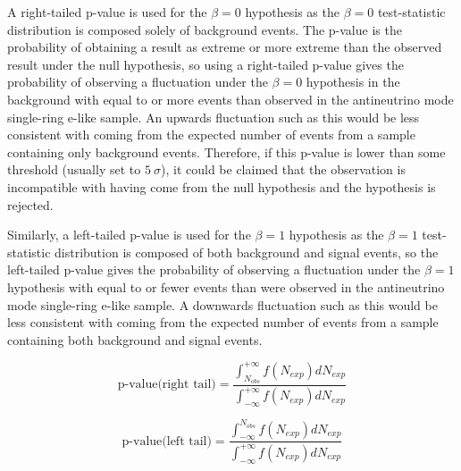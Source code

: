 A right-tailed p-value is used for the $\beta = 0$ hypothesis as the $\beta = 0$ test-statistic distribution is composed solely of background events. The p-value is the probability of obtaining a result as extreme or more extreme than the observed result under the null hypothesis, so using a right-tailed p-value gives the probability of observing a fluctuation under the $\beta = 0$ hypothesis in the background with equal to or more events than observed in the antineutrino mode single-ring e-like sample. An upwards fluctuation such as this would be less consistent with coming from the expected number of events from a sample containing only background events. Therefore, if this p-value is lower than some threshold (usually set to $\SI{5}{\sigma}$), it could be claimed that the observation is incompatible with having come from the null hypothesis and the hypothesis is rejected. 

Similarly, a left-tailed p-value is used for the $\beta = 1$ hypothesis as the $\beta = 1$ test-statistic distribution is composed of both background and signal events, so the left-tailed p-value gives the probability of observing a fluctuation under the $\beta = 1$ hypothesis with equal to or fewer events than were observed in the antineutrino mode single-ring e-like sample. A downwards fluctuation such as this would be less consistent with coming from the expected number of events from a sample containing both background and signal events.

\begin{equation} \label{eq:pval_right}
\textrm{p-value} \textrm{(right tail)} = 
\frac{\int_{N_{obs}}^{+\infty} f \left( N_{exp} \right) dN_{exp}}{ \int_{-\infty}^{+\infty} f \left( N_{exp} \right) dN_{exp}}
\end{equation}

\begin{equation} \label{eq:pval_left}
\textrm{p-value} \textrm{(left tail)} = 
\frac{\int^{N_{obs}}_{-\infty} f \left( N_{exp} \right) dN_{exp}}{ \int_{-\infty}^{+\infty} f \left( N_{exp} \right) dN_{exp}}
\end{equation}


